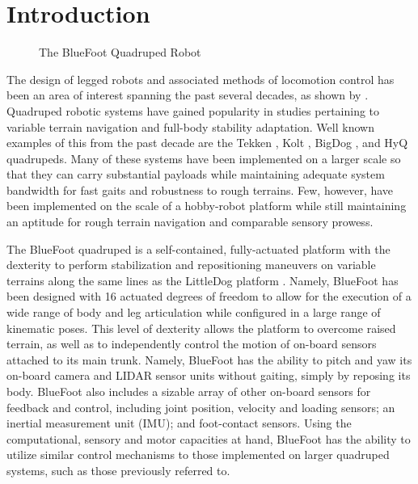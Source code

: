 \chapter{Introduction}
	\label{ch::introduction}
	
	\begin{figure}[h!]
		\centering
		\caption{The BlueFoot Quadruped Robot}
		\label{fig::bluefoot_glamour}
	\end{figure}
		The design of legged robots and associated methods of locomotion control has been an area of interest spanning the past several decades, as shown by \cite{McGhee1965,Hodgins1991,Altendorfer2001,Kolter2008,Wieber2015}. Quadruped robotic systems have gained popularity in studies pertaining to variable terrain navigation and full-body stability adaptation. Well known examples of this from the past decade are the Tekken \cite{Fukuoka2003}, Kolt \cite{Estremera2006}, BigDog \cite{BigDog2008}, and HyQ \cite{Semini2010_PHD} quadrupeds. Many of these systems have been implemented on a larger scale so that they can carry substantial payloads while maintaining adequate system bandwidth for fast gaits and robustness to rough terrains. Few, however, have been implemented on the scale of a hobby-robot platform while still maintaining an aptitude for rough terrain navigation and comparable sensory prowess.

		The BlueFoot quadruped is a self-contained, fully-actuated platform with the dexterity to perform stabilization and repositioning maneuvers on variable terrains along the same lines as the LittleDog platform \cite{Rebula2007}. Namely, BlueFoot has been designed with 16 actuated degrees of freedom to allow for the execution of a wide range of body and leg articulation while configured in a large range of kinematic poses. This level of dexterity allows the platform to overcome raised terrain, as well as to independently control the motion of on-board sensors attached to its main trunk. Namely, BlueFoot has the ability to pitch and yaw its on-board camera and LIDAR sensor units without gaiting, simply by reposing its body. BlueFoot also includes a sizable array of other on-board sensors for feedback and control, including joint position, velocity and loading sensors; an inertial measurement unit (IMU); and foot-contact sensors. Using the computational, sensory and motor capacities at hand, BlueFoot has the ability to utilize similar control mechanisms to those implemented on larger quadruped systems, such as those previously referred to. 

